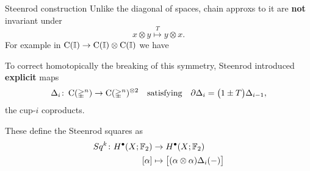 
\begin{frame}{Steenrod construction}
	\pause
	Unlike the diagonal of spaces, chain approxs to it are \textbf{not} invariant under
	\[
	x \otimes y \stackrel{T}{\mapsto} y \otimes x.
	\]
	For example in $\operatorname{C}(\mathbb{I}) \to \operatorname{C}(\mathbb{I}) \otimes \operatorname{C}(\mathbb{I})$ we have
	\begin{center}
	\end{center}

	\smallskip\pause
	To correct homotopically the breaking of this symmetry, Steenrod introduced \textbf{explicit} maps
	\[
	\Delta_i \colon \operatorname{C}(\mathbb{\Delta}^n) \to \operatorname{C}(\mathbb{\Delta}^n)^{\otimes 2}
	\quad \text{satisfying} \quad
	\partial \Delta_{i} = \big(1 \pm T \big) \Delta_{i-1},
	\]
	the cup-$i$ coproducts.

	\smallskip\pause
	These define the Steenrod squares as
	\[
	\begin{split}
		Sq^k \colon H^\bullet(X; {\mathbb{F}_2}) &\to H^\bullet(X; {\mathbb{F}_2}) \\
		[\alpha] &\mapsto \big[ (\alpha \otimes \alpha) \Delta_i(-) \big]
	\end{split}
	\]
\end{frame}


